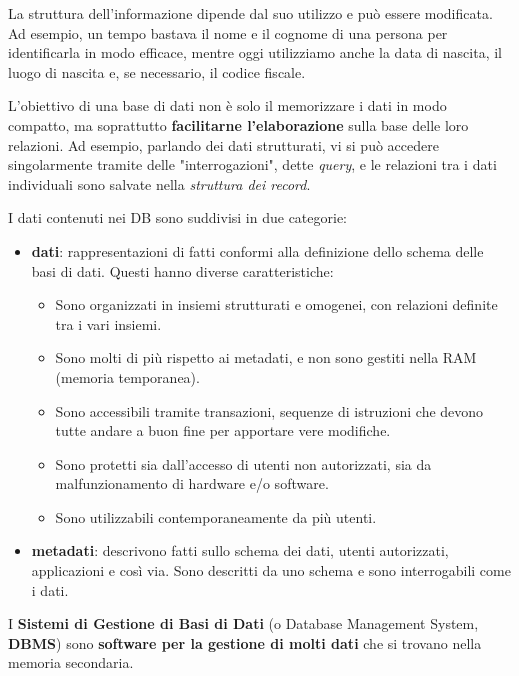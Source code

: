 \documentclass[11pt, a4paper, titlepage, oneside]{scrbook}
\begin{document}
La struttura dell'informazione dipende dal suo utilizzo e può essere modificata. Ad esempio, un tempo bastava il nome e il cognome di una persona per identificarla in modo efficace, mentre oggi utilizziamo anche la data di nascita, il luogo di nascita e, se necessario, il codice fiscale. 

L'obiettivo di una base di dati non è solo il memorizzare i dati in modo compatto, ma soprattutto \textbf{facilitarne l'elaborazione} sulla base delle loro relazioni. Ad esempio, parlando dei dati strutturati, vi si può accedere singolarmente tramite delle "interrogazioni", dette \textit{query}, e le relazioni tra i dati individuali sono salvate nella \textit{struttura dei record}. 

I dati contenuti nei DB sono suddivisi in due categorie:
\begin{itemize}
    \item \textbf{dati}: rappresentazioni di fatti conformi alla definizione dello schema delle basi di dati. Questi hanno diverse caratteristiche:
    \begin{itemize}
        \item Sono organizzati in insiemi strutturati e omogenei, con relazioni definite tra i vari insiemi.
        \item Sono molti di più rispetto ai metadati, e non sono gestiti nella RAM (memoria temporanea).
        \item Sono accessibili tramite transazioni, sequenze di istruzioni che devono tutte andare a buon fine per apportare vere modifiche.
        \item Sono protetti sia dall'accesso di utenti non autorizzati, sia da malfunzionamento di hardware e/o software.
        \item Sono utilizzabili contemporaneamente da più utenti.
    \end{itemize}
    \item \textbf{metadati}: descrivono fatti sullo schema dei dati, utenti autorizzati, applicazioni e così via. Sono descritti da uno schema e sono interrogabili come i dati.
\end{itemize}

\begin{Definizione}
\label{def-sistemi-gestione-basi-dati}
I \textbf{Sistemi di Gestione di Basi di Dati} (o Database Management System, \textbf{DBMS}) sono \textbf{software per la gestione di molti dati} che si trovano nella memoria secondaria.
\end{Definizione}
\end{document}
